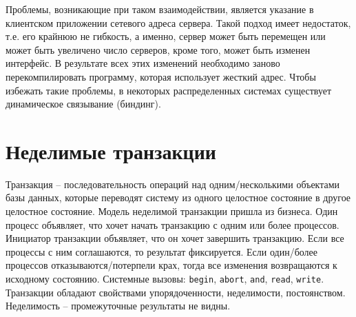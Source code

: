 Проблемы, возникающие при таком взаимодействии, является указание в клиентском приложении сетевого адреса сервера. Такой подход имеет недостаток, т.е. его крайнюю не гибкость, а именно, сервер может быть перемещен или может быть увеличено число серверов, кроме того, может быть изменен интерфейс. В результате всех этих изменений необходимо заново перекомпилировать программу, которая использует жесткий адрес. Чтобы избежать такие проблемы, в некоторых распределенных системах существует динамическое связывание (биндинг).

\section{Неделимые транзакции}

Транзакция – последовательность операций над одним/несколькими объектами базы данных, которые переводят систему из одного целостное состояние в другое целостное состояние. 
Модель неделимой транзакции пришла из бизнеса. Один процесс объявляет, что хочет начать транзакцию с одним или более процессов. Инициатор транзакции объявляет, что он хочет завершить транзакцию. Если все процессы с ним соглашаются, то результат фиксируется. Если один/более процессов отказываются/потерпели крах, тогда все изменения возвращаются к исходному состоянию. 
Системные вызовы: \verb|begin|, \verb|abort|, \verb|and|, \verb|read|, \verb|write|.
Транзакции обладают свойствами упорядоченности, неделимости, постоянством.
Неделимость – промежуточные результаты не видны.

